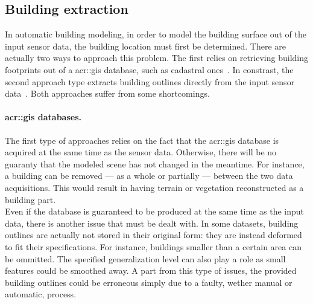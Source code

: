     \subsection{Building extraction}
        \label{subsec::state_of_the_art::building_modeling::building_extraction}
        In automatic building modeling, in order to model the building surface out of the input sensor data, the building location must first be determined.
        There are actually two ways to approach this problem.
        The first relies on retrieving building footprints out of a \gls{acr::gis} database, such as cadastral ones~\parencite{taillandier2004automatic,durupt2006automatic,horna2007building,ledoux2011topologically,biljecki2017generating,biljecki2019raise}.
        In constrast, the second approach type extracts building outlines directly from the input sensor data~\parencite{poullis2009automatic,lafarge2012creating,nguatem2017modeling,zhu2018large}.
        Both approaches suffer from some shortcomings.

        \paragraph{\gls{acr::gis} databases.}
            The first type of approaches relies on the fact that the \gls{acr::gis} database is acquired at the same time as the sensor data.
            Otherwise, there will be no guaranty that the modeled scene has not changed in the meantime.
            For instance, a building can be removed --- as a whole or partially --- between the two data acquisitions.
            This would result in having terrain or vegetation reconstructed as a building part.\\

            Even if the database is guaranteed to be produced at the same time as the input data, there is another issue that must be dealt with.
            In some datasets, building outlines are actually not stored in their original form: they are instead deformed to fit their specifications.
            For instance, buildings smaller than a certain area can be ommitted.
            The specified generalization level can also play a role as small features could be smoothed away.
            A part from this type of issues, the provided building outlines could be erroneous simply due to a faulty, wether manual or automatic, process.\\
        

